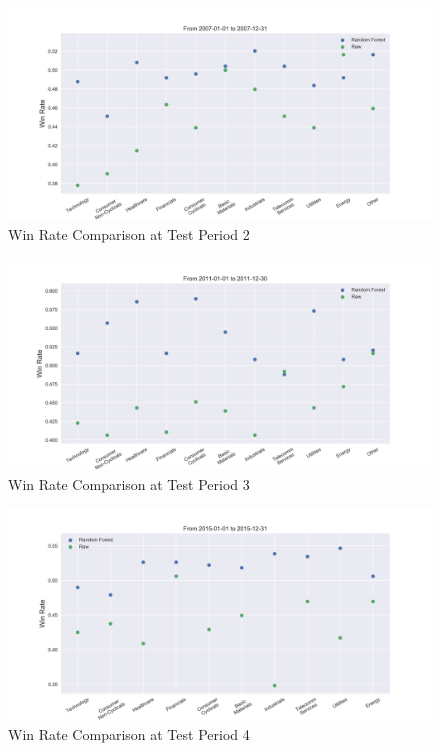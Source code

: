 \documentclass[12pt]{article}
\begin{document}
\begin{figure}[!ht]
  \begin{center}
    \includegraphics[width=1\linewidth]{figure/rf_raw_win_rate_time_1.png}
  \end{center}
  \caption{Win Rate Comparison at Test Period 2}
  \label{fig:rf_raw_win_rate_time_2}
\end{figure}

\begin{figure}[!ht]
  \begin{center}
    \includegraphics[width=1\linewidth]{figure/rf_raw_win_rate_time_2.png}
  \end{center}
  \caption{Win Rate Comparison at Test Period 3}
  \label{fig:rf_raw_win_rate_time_3}
\end{figure}

\begin{figure}[!ht]
  \begin{center}
    \includegraphics[width=1\linewidth]{figure/rf_raw_win_rate_time_3.png}
  \end{center}
  \caption{Win Rate Comparison at Test Period 4}
  \label{fig:rf_raw_win_rate_time_4}
\end{figure}

\renewcommand{\refname}{Reference} %
\printbibliography
\end{document}
